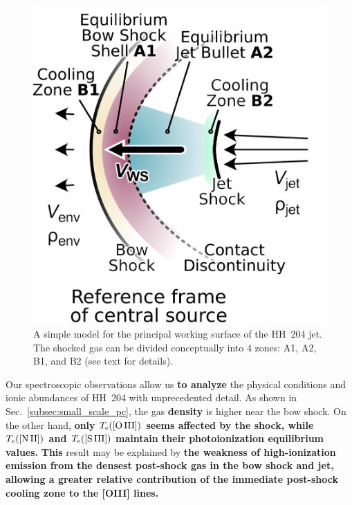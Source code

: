 \documentclass[twocolumn,linenumbers]{aastex63}
\begin{document}
\label{subsubsec:two_temps_model}
\begin{figure}
  \includegraphics[width=\linewidth]{working-surface-hh204-single}
  \caption{
    A simple model for the principal working surface of the HH~204 jet.
    The shocked gas can be divided conceptually into 4 zones:
    A1, A2, B1, and B2 (see text for details).
  }
  \label{fig:working-surface}
\end{figure}

Our spectroscopic observations allow us \textbf{to analyze} the physical conditions and ionic abundances of HH~204 with unprecedented detail. As  shown in Sec.~\ref{subsec:small_scale_pc},  the gas \textbf{density} is higher near the bow shock. On the other hand,
\textbf{\boldmath only $T_{\rm e}(\text{[O\thinspace III]})$ seems affected by the shock, while $T_{\rm e}(\text{[N\thinspace II]})$ and $T_{\rm e}(\text{[S\thinspace III]})$ maintain their photoionization equilibrium values.}
\textbf{This} result may be explained by
\textbf{the weakness of high-ionization emission from the densest post-shock gas in the bow shock and jet, allowing a greater relative contribution of the immediate post-shock cooling zone to the [O\thinspace III] lines.}
\end{document}
